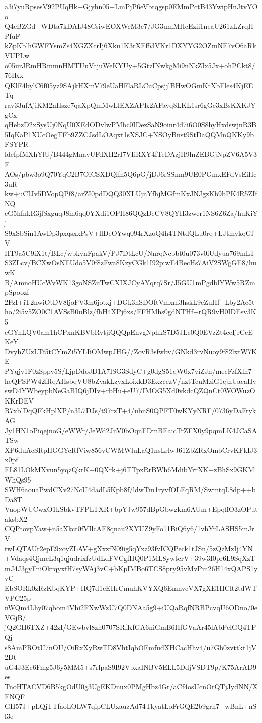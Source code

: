 a3i7yuRpsesV92PUqHk+Gjyhn05+LmPjP6eVbtqgsp0EMmPctB43YwipHnJtvYOo
Q4eBZGd+WDta7kDAIJ48CsiwEOXWcM3c7/JG3umMHcEzii1neaU261zLZrqHPfuF
kZpKblhGWFYsmZs4XGZXcrIj6Xku1K3rXEf53VKr1DXYYG2OZmNE7vO6aRkVUPLw
o05urJRmHRmmnHMTUuVtjuWeKYUy+5GtzINwkgMi9nNkZIx5Jx+ohPCkt8/76IKx
QKlF4bylC6f05yz9SAjkHXmV79eUaHFlaRLCuCpsjjlBHwOGmKtXbFles4KjEETq
rav33ufAjiKM2nHsze7qaXpQmMwLlEXZAPK2AFavq8LKL1sr6gGe3xBsKXKJYgCx
qHebzD2xSysUj0NqU0XEdODvlwPMbc0IDezSaN9oinr4d7i6O0S8hyHxdswjnR3B
5IqKaP1XUcOegTFb9ZZCJsdLOAqxt1sXSJC+NSOyBnst9StDaQQMnQKKy9bFSYPR
ldefpfMXhYlU/B444gMnavUFdXH2rI7VIiRXY4fTeDAzjH9lnZEBGjNpZV6A5V3F
AOs/pbw3o9Q70YqC2B7OiCSXDQlfh5Q6pG/jDJ6rSSnm9UE0PGmxEFdVsEiHc3uR
kw+uCIJv5DVopQPf8/arZI0pdDQQ30XLUjnYfhjMGfmKxJNJgzKb9bPK4R5ZIfNQ
cG5hfnkR3jfSxguqJ8m6qq0YXdi1OPH86QQzDeCV8QYH3zwer1NS6Z6Za/huKiYj
S9xSbSin1AwDp3pxqsxxPsV+llDeOYwq094rXzoQ4h4TNtdQLu0rq+LJtmykqGfV
HT9a5C9iX1t/BLc/wbkvnFpakV/PJ7DtLcU/NnrqNcbbt0u073v0iUdyua769mLT
S3ZLcv/BCXwOsNEUdo5V0f8zFwa8KzyCGk1I92piwE4BecHs7AiV2SWgGE8/huwK
B/AmnoHUcWvWK13goNSZuTwCXIXJCyAYqrq7Sr/J5GU1mPgdblYWw5RZmpSpoozf
2FzI+iT2nwiOtDV8ljoFV3m6jotxj+DGk3nSDOftVmxm3hskL9eZuHf+Lby2Ae5t
ho/2i5v5ZO0C1AVSsB0uBlz/fhH4XPj6xs/FFHMhs0gdNTHf+rQR9vH0IDEsv3K5
eGYnLQV0am1hCPxnKBVbRvtjiQQQpEnvgNphkS7D5JLc0Q0EVzZt4ceIjrCcEKeY
DvyhZUzLTf5tCYmZi5YLIiOMwpJHG//ZovR3sfwbv/GNkd3rvNuoy9f82lxtW7KE
PYqjv1F0zSppv5S/LjpDdoJD1A7ISG3SdyC+g0dgS51qW0x7viZJn/mecFzfXlh7
heQPSPW42fRqAHsbqVU8bZvakLzyxLoixkD3ExzcezV/nztTcuMziG1cjnUacaHy
swD4YWbeypbNeGaBIQ6jDIv+rbHu+eU7/IMOG5Xd0vkdcQZQnCt0WOWuzOKKrDEV
R7xblDqQFkHplXP/n3L7DJs/t97rzT+4/ubnS0QPFT0wKYyNRF/0736yDaFrykAG
Jy1HN1oPiqejnoG/eWWr/JeWd2JnV0bOqnFDmBEaicTrZFX0y9pqmLK4JCaSATSw
XP6duAcSRpHGGYcRfViw856vCWMWluLaQ1nsLrlwJ61ZbZRxOmbCrvKFkIJ3x0pf
EL81LOkMXvun5yqzQkrK+0QXrk+j6TTpxRrBWh6MdibYrrXK+zBhSx9GKMWhQs95
SWH6aouaPwdCXv27NcU4dadL5Kpb8f/ldwTm1ryvfOLFqRM/SwmtqL8dp++bDa8T
VuopWUCwxO1kSbkvTFPLTXR+bpYJw957dBpGbwgkm6AUm+EpqffO3zOPutaksbX2
CQPtovpYaw+n5aXkct0fVIlcAE8qnau2XYUZ9yFo11BiQ6y6/1vhYrLASHS5mJrV
twLQTAUr2epE9xoyZLAV+gXxzfN09ig5qYxz93fvICQPeck1tJSn/5zQzMzIj4YN
+Vdaqs4QjmcL3q1qjudrixfzUdLdFVCgfHQ0P1ML8ywtcrV+39w3I0pr6L9SqXzT
mJ4J3gyFniOkrqyxfH7syWAj3vC+bKpIMBo6TCS8pry95vMvPm26H14xQAPS1yvC
EbSORk0zRzKbqKYP+IIQ7d1cEHrCmuhKVYXQ6EmnvcVX7gXE1HClt2tdWTVPC25p
nWQm4Lhy07qbom4Vhi2FXwWzU7Q0DNAa5g9+iUQaRqfNRBPcvqU6ODno/0eVGjB/
jQ2GH6TXZ+42zI/GEwbvl8zn0707SRfKfGA6niGmB6HfGVaAr45lAbPelGQ4TFQj
s8AmPROtU7nOU/OiRxXyRwTD8VhtIqbOEmfudXHCacHhv4/u7Gb0zvttkt1jV2Dt
uG4J3Ec6Fmg5J6y5MM5+s7rlpaS9I92VbxaINBV5ELL5DdjVSDT9p/K75ArAD9es
TnoHTACVD6B5kgOdU0g3UgEKDnux0PMgHbz4Gr/aCf4osUcnOrQTjJydNN/XENQF
GH57J+pLQjTTfaoLOLW7qipCLUxauzAd74TkyatLoFrGQE2b9grh7+wBnL+nSl3e
